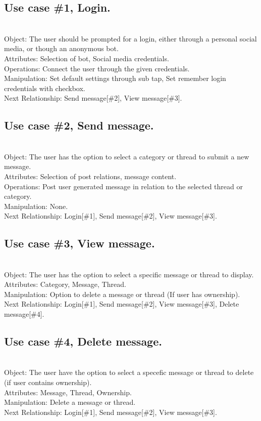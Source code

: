 \subsection{Use case \#1, Login.}\\
\label{usecase_bot}
Object: The user should be prompted for a login, either through a personal social media, or though an anonymous bot.\\
Attributes: Selection of bot, Social media credentials.\\
Operations: Connect the user through the given credentials.\\
Manipulation: Set default settings through sub tap,  Set remember login credentials with checkbox.\\
Next Relationship: Send message[\#2], View message[\#3].
\noindent
\subsection{Use case \#2, Send message.}\\
Object: The user has the option to select a category or thread to submit a new message.\\
Attributes: Selection of post relations, message content.\\
Operations: Post user generated message in relation to the selected thread or category.\\
Manipulation: None.\\
Next Relationship: Login[\#1], Send message[\#2], View message[\#3].
\noindent
\subsection{Use case \#3, View message.}\\
Object: The user has the option to select a specific message or thread to display.\\
Attributes: Category, Message, Thread.\\
Manipulation: Option to delete a message or thread (If user has ownership).\\
Next Relationship: Login[\#1], Send message[\#2], View message[\#3], Delete message[\#4].
\noindent
\subsection{Use case \#4, Delete message.}\\
Object: The user have the option to select a specefic message or thread to delete (if user contains ownership).\\
Attributes: Message, Thread, Ownership.\\
Manipulation: Delete a message or thread.\\
Next Relationship: Login[\#1], Send message[\#2], View message[\#3].